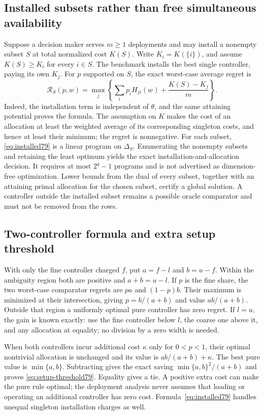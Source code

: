 \subsection{Installed subsets rather than free simultaneous availability}
Suppose a decision maker serves $m\ge1$ deployments and may install a nonempty subset $S$ at total normalized cost $K(S)$. Write $K_i=K(\{i\})$, and assume $K(S)\ge K_i$ for every $i\in S$. The benchmark installs the best single controller, paying its own $K_j$. For $p$ supported on $S$, the exact worst-case average regret is
\begin{equation}\label{eq:installed79}
 \mathcal R_S(p,w)=\max_j\left\{\sum_i p_iH_{ji}(w)
                   +\frac{K(S)-K_j}{m}\right\}.
\end{equation}
Indeed, the installation term is independent of $\theta$, and the same attaining potential proves the formula. The assumption on $K$ makes the cost of an allocation at least the weighted average of its corresponding singleton costs, and hence at least their minimum; the regret is nonnegative. For each subset, \eqref{eq:installed79} is a linear program on $\Delta_S$. Enumerating the nonempty subsets and retaining the least optimum yields the exact installation-and-allocation decision. It requires at most $2^q-1$ programs and is not advertised as dimension-free optimization. Lower bounds from the dual of every subset, together with an attaining primal allocation for the chosen subset, certify a global solution. A controller outside the installed subset remains a possible oracle comparator and must not be removed from the rows.

\subsection{Two-controller formula and extra setup threshold}
With only the fine controller charged $f$, put $a=f-l$ and $b=u-f$. Within the ambiguity region both are positive and $a+b=u-l$. If $p$ is the fine share, the two worst-case comparator regrets are $pa$ and $(1-p)b$. Their maximum is minimized at their intersection, giving $p=b/(a+b)$ and value $ab/(a+b)$. Outside that region a uniformly optimal pure controller has zero regret. If $l=u$, the gain is known exactly: use the fine controller below $l$, the coarse one above it, and any allocation at equality; no division by a zero width is needed.

When both controllers incur additional cost $\kappa$ only for $0<p<1$, their optimal nontrivial allocation is unchanged and its value is $ab/(a+b)+\kappa$. The best pure value is $\min\{a,b\}$. Subtracting gives the exact saving $\min\{a,b\}^2/(a+b)$ and proves \eqref{eq:setup-threshold79}. Equality gives a tie. A positive extra cost can make the pure rule optimal; the deployment analysis never assumes that loading or operating an additional controller has zero cost. Formula~\eqref{eq:installed79} handles unequal singleton installation charges as well.

